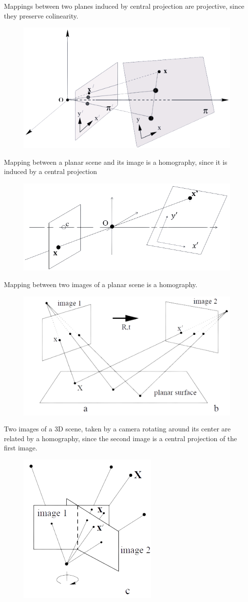 \documentclass[12pt, a4paper]{report}
\newtheorem[style=M,bodystyle=\normalfont]{theorem}{Theorem}
\newtheorem[style=M,bodystyle=\normalfont]{corollary}{Corollary}
\newtheorem[style=M,bodystyle=\normalfont]{lemma}{Lemma}
\newtheorem[style=M,bodystyle=\normalfont]{definition}{Definition}
\begin{document}
    \begin{example}
        Mappings between two planes induced by central projection are projective, since they preserve colinearity. 
        \begin{figure}[H]
            \centering
            \includegraphics[width=0.5\linewidth]{images/map1.png}
        \end{figure}
        Mapping between a planar scene and its image is a homography, since it is induced by a central projection
        \begin{figure}[H]
            \centering
            \includegraphics[width=0.5\linewidth]{images/map2.png}
        \end{figure}
        Mapping between two images of a planar scene is a homography.
        \begin{figure}[H]
            \centering
            \includegraphics[width=0.5\linewidth]{images/map3.png}
        \end{figure}
        Two images of a 3D scene, taken by a camera rotating around its center are related by a homography, since the second image is a central projection of the first image. 
        \begin{figure}[H]
            \centering
            \includegraphics[width=0.4\linewidth]{images/map4.png}

\end{figure}
\end{example}
\end{document}
